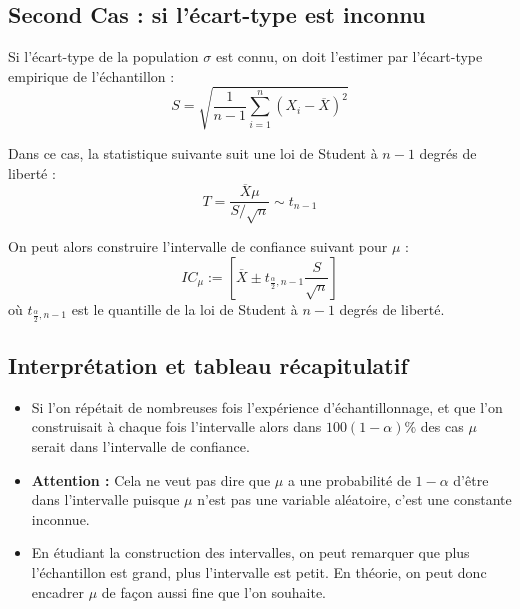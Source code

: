 \subsection{Second Cas : si l'écart-type est inconnu}

Si l'écart-type de la population $\sigma$ est connu, on doit l'estimer par l'écart-type 
empirique de l'échantillon :
    \[ S = \sqrt{\frac{1}{n-1} \sum_{i=1}^{n} (X_i - \overline{X})^2 } \] 

Dans ce cas, la statistique suivante suit une loi de Student à $n-1$ degrés de liberté : 
    \[ T = \frac{\overline{X}  \mu}{S/\sqrt{n}} \sim t_{n-1} \] 

On peut alors construire l'intervalle de confiance suivant pour $\mu$ : 
    \[ \boxed{ IC_\mu := \left[\overline{X} \pm t_{\frac{\alpha}{2},n-1} \frac{S}{\sqrt{n}}\right] } \] 
où $t_{\frac{\alpha}{2},n-1}$ est le quantille de la loi de Student à $n-1$ degrés de liberté. 

\subsection{Interprétation et tableau récapitulatif}

\begin{itemize}
    \item Si l'on répétait de nombreuses fois l'expérience d'échantillonnage, et que l'on construisait à chaque fois 
    l'intervalle alors dans $100 (1 - \alpha) \%$ des cas $\mu$ serait dans l'intervalle de confiance. 
    \item \textbf{Attention : } Cela ne veut pas dire que $\mu$ a une probabilité de $1 - \alpha$ d'être dans l'intervalle 
    puisque $\mu$ n'est pas une variable aléatoire, c'est une constante inconnue. 
    \item En étudiant la construction des intervalles, on peut remarquer que plus l'échantillon est grand, plus l'intervalle 
    est petit. En théorie, on peut donc encadrer $\mu$ de façon aussi fine que l'on souhaite. 
\end{itemize}


